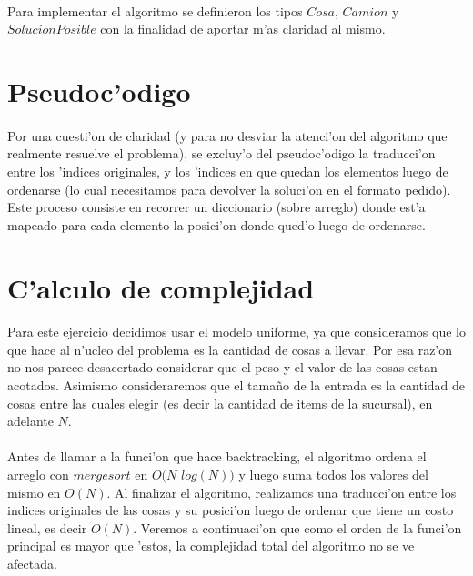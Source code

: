 \paragraph{}
Para implementar el algoritmo se definieron los tipos $Cosa$, $Camion$ y $SolucionPosible$ con la finalidad de aportar m'as claridad al mismo.

\newpage
\section{Pseudoc'odigo}


\paragraph{}
Por una cuesti'on de claridad (y para no desviar la atenci'on del algoritmo que realmente resuelve el problema), 
se excluy'o del pseudoc'odigo la traducci'on entre los 'indices originales, y los 'indices en que quedan los 
elementos luego de ordenarse (lo cual necesitamos para devolver la soluci'on en el formato pedido). Este proceso 
consiste en recorrer un diccionario (sobre arreglo) donde est'a mapeado para cada elemento la posici'on donde 
qued'o luego de ordenarse.
 
\newpage
\section{C'alculo de complejidad}
\paragraph{}
Para este ejercicio decidimos usar el modelo uniforme, ya que consideramos que lo que hace al n'ucleo del problema es la
cantidad de cosas a llevar. Por esa raz'on no nos parece desacertado considerar que el peso y el valor de las cosas estan 
acotados. Asimismo consideraremos que el tama\~{n}o de la entrada es la cantidad de cosas entre las cuales elegir 
(es decir la cantidad de items de la sucursal), en adelante $N$.
\paragraph{}
Antes de llamar a la funci'on que hace backtracking, el algoritmo ordena el arreglo con $merge sort$ en 
$O(N$ $log(N))$ y luego suma todos los valores del mismo en $O(N)$. Al finalizar el algoritmo, realizamos 
una traducci'on entre los indices originales de las cosas y su posici'on luego de ordenar que tiene un costo 
lineal, es decir $O(N)$. Veremos a continuaci'on que como el orden de la funci'on principal es mayor que 'estos, 
la complejidad total del algoritmo no se ve afectada.
